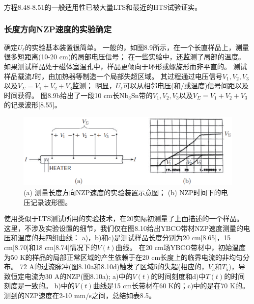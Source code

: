 方程8.48-8.51的一般适用性已被大量LTS和最近的HTS试验证实。

\subsubsection*{长度方向NZP速度的实验确定}
确定$U_\ell$的实验基本装置很简单。
一般的，如图8.9所示，在一个长直样品上，测量很多短距离(10-20 cm)的局部电压信号；
在一些实验中，还监测了局部的温度。
如果测试样品处于磁体室温孔中，样品更倾向于环形或螺旋形而非平直的。
测试样品载流$I$时，由加热器等制造一个局部失超区域。
其过程通过电压信号$V_1,V_2,V_3$以及$V_\Sigma =V_1+V_2+V_3$监测；
明显，$U_\ell$可以从相邻电压(和/或温度)信号间距以及时间获得。
图8.9b给出了一段10 cm长$\mathrm{Nb_3Sn}$带的$V_1,V_2,V_3$以及$V_\Sigma =V_1+V_2+V_3$的记录波形[8.55]。

\begin{figure}
	\centering
	\includegraphics[scale=0.5]{chpt8/figs/fig8.9.eps}
	\caption{(a) 测量长度方向NZP速度的实验装置示意图；
		(b) NZP时间下的电压记录波形图。}
\end{figure}

使用类似于LTS测试所用的实验技术，在20实际初测量了上面描述的一个样品。
这里，不涉及实验设置的细节，我们仅在图8.10给出YBCO带材NZP速度测量的电压和温度的共四组曲线：
a)，b)和c)是测试样品长度分别为20 cm[8.65]，15 cm[8.70]和18 cm[8.74]情况下的$V(t)$曲线。
在20 cm场YBCO带材中，初始温度为50 K的样品的局部正常区域的产生依赖于在20 cm长度上的临界电流的非均匀分布。
72 A的过流脉冲(图8.10a和8.10d)触发了区域5的失超(相应的，$V_5$和$T_5$)，导致恒定电流为30 A的NZP(图8.10a);
a)中的$V(t)$的时间刻度和d)中$T(t)$的时间刻度是一致的。
b)中的$V(t)$曲线是15 cm长带材在60 K的；c)中的是在70 K的。
测到的NZP速度在2-10 mm/s之间，总结如表8.5。

